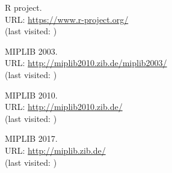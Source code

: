 \documentclass[a4paper,12pt,twoside]{scrbook}
\begin{document}
\begin{thebibliography}{9}
	 R project. \\ URL: \url{https://www.r-project.org/} \\ (last visited: )

	 MIPLIB 2003. \\ URL: \url{http://miplib2010.zib.de/miplib2003/} \\ (last visited: )

	 MIPLIB 2010. \\ URL: \url{http://miplib2010.zib.de/} \\ (last visited: )

	 MIPLIB 2017. \\ URL: \url{http://miplib.zib.de/} \\ (last visited: )
	
\end{thebibliography}
\end{document}
